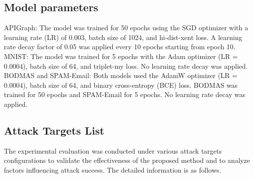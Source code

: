 \subsection{Model parameters}
\label{Sec: Model parameters}
APIGraph: The model was trained for 50 epochs using the SGD optimizer with a learning rate (LR) of 0.003, batch size of 1024, and hi-dist-xent loss.
A learning rate decay factor of 0.05 was applied every 10 epochs starting from epoch 10.
MNIST: The model was trained for 5 epochs with the Adam optimizer (LR = 0.0004), batch size of 64, and triplet-my loss. No learning rate decay was applied.
BODMAS and SPAM-Email: Both models used the AdamW optimizer (LR = 0.0004), batch size of 64, and binary cross-entropy (BCE) loss.
BODMAS was trained for 50 epochs and SPAM-Email for 5 epochs. No learning rate decay was applied.

\subsection{Attack Targets List}
\label{Sec: Attack Target List}
The experimental evaluation was conducted under various attack targets configurations to validate the effectiveness of the proposed method and to analyze factors influencing attack success.
The detailed information is as follows.


